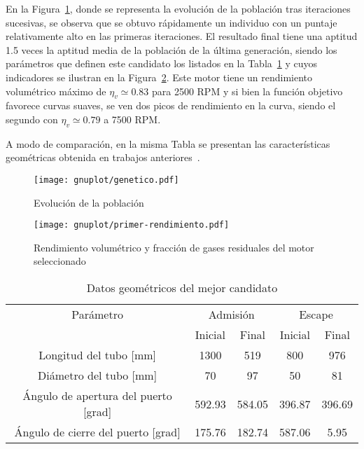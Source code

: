 %
%

En la Figura~\ref{fig:ev_primer_op}, donde se representa la evolución de la
población tras iteraciones sucesivas, se observa que se obtuvo rápidamente un
individuo con un puntaje relativamente alto en las primeras iteraciones.
%
El resultado final tiene una aptitud 1.5 veces la aptitud media de la población
de la última generación, siendo los parámetros que definen este candidato los
listados en la Tabla~\ref{tab:resultado_primer_it} y cuyos indicadores se
ilustran en la Figura~\ref{fig:primer_op}.
%
Este motor tiene un rendimiento volumétrico máximo de $\eta_{v} \simeq 0.83$
para 2500 RPM y si bien la función objetivo favorece curvas suaves, se ven dos
picos de rendimiento en la curva, siendo el segundo con $\eta_{v} \simeq 0.79$ a
7500 RPM.

A modo de comparación, en la misma Tabla se presentan las características
geométricas obtenida en trabajos anteriores~\parencite{mrcvc_geom}.

\begin{figure}[h!]
  \centering
  \texttt{[image: gnuplot/genetico.pdf]}
  \caption{Evolución de la población} \label{fig:ev_primer_op}
\end{figure}%
\begin{figure}[h!]
  \centering
  \texttt{[image: gnuplot/primer-rendimiento.pdf]}
  \caption{Rendimiento volumétrico y fracción de gases residuales del motor seleccionado} \label{fig:primer_op}
\end{figure}

\begin{table}[h!]
  \centering
  \begin{tabular}{ccccc} \toprule
    Parámetro & \multicolumn{2}{c}{Admisión} & \multicolumn{2}{c}{Escape} \\ \cmidrule(lr){2-3} \cmidrule(lr){4-5} & Inicial & Final & Inicial & Final \\
    \midrule
    Longitud del tubo [mm]               & 1300   & 519    & 800    & 976  \\
    Diámetro del tubo [mm]               & 70     & 97     & 50     & 81   \\
    Ángulo de apertura del puerto [grad] & 592.93 & 584.05 & 396.87 & 396.69 \\
    Ángulo de cierre del puerto [grad]   & 175.76 & 182.74 & 587.06 & 5.95 \\
    \bottomrule
  \end{tabular}
  \caption{Datos geométricos del mejor candidato}
  \label{tab:resultado_primer_it}
\end{table}


